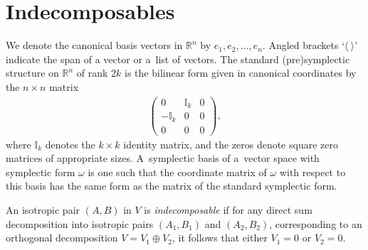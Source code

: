 \documentclass[10pt,a4paper]{amsart}
\numberwithin{equation}{section}
\begin{document}
\section{Indecomposables}\label{indecomposables}

We denote the canonical basis vectors in $\mathbb{R}^n$ by $e_1, e_2, \dots , e_n$. Angled brackets `{$\langle \  \rangle$}' indicate the span of a vector or a~list of vectors. The standard (pre)symplectic structure on $\mathbb{R}^n$ of rank $2k$ is the bilinear form given in canonical coordinates by the $n \times n$ matrix
\begin{gather*}
\left(
\begin{matrix}
0 & \mathbb{I}_k & 0  \\
-\mathbb{I}_k & 0 & 0  \\
0 & 0 & 0
\end{matrix}
\right),
\end{gather*}
where $\mathbb{I}_k$ denotes the $k \times k$ identity matrix, and the zeros denote square zero matrices of appropriate sizes. A~symplectic basis of a~vector space with symplectic form $\omega$ is one such that the coordinate matrix of $\omega$ with respect to this basis has the same form as the matrix of the standard symplectic form.

\begin{Definition}\label{indecomposable}
An isotropic pair $(A,B)$ in $V$ is \textit{indecomposable} if for any direct sum decomposition into isotropic pairs $(A_1,B_1)$ and $(A_2,B_2)$, corresponding to an orthogonal decomposition $V=V_1 \oplus V_2$, it follows that either $V_1 = 0$ or $V_2 = 0$.
\end{Definition}
\end{document}
